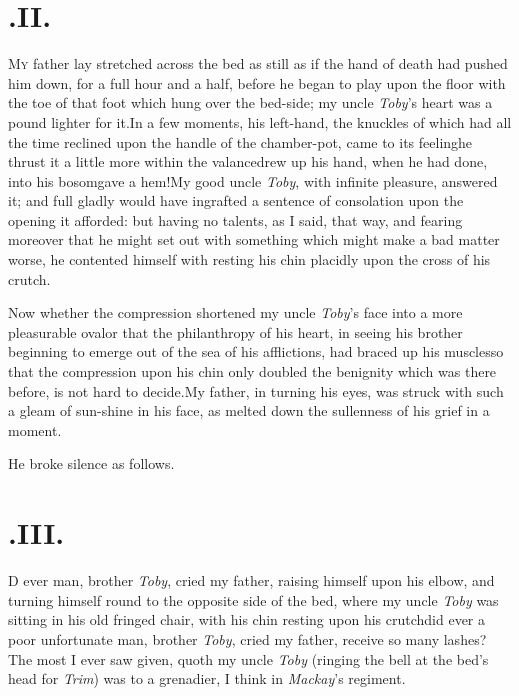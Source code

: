 \documentclass{article}
\begin{document}
\section{.\enspace II.}

\lettrine{M}{y} father lay stretched across the
bed as still as if the hand of death had pushed him down, for a
full hour and a half, before he began to play upon the floor
with the toe of that foot which hung over the bed-side; my uncle
\textit{Toby}’s heart was a pound lighter for
it.\tsh In a few moments, his left-hand, the knuckles of
which had all the time reclined upon the handle of the chamber-pot,
came to its feeling\tsk he thrust it a little more within the
valance\tsk drew up his hand, when he had done, into his
bosom\tsk gave a hem!\tsk My good uncle \textit{Toby}, with infinite
pleasure, answered it; and full gladly would have ingrafted a
sentence of consolation upon the opening it afforded: but having no
talents, as I said, that way, and fearing moreover that he might
set out with something which might make a bad matter worse, he
contented himself with resting his chin placidly upon the cross of
his crutch.

Now whether the compression shortened my uncle
\textit{Toby}’s face into a more pleasurable oval\tsk or that
the philanthropy of his heart, in seeing his brother beginning to
emerge out of the sea of his afflictions, had braced up his
muscles\tsh so that the compression upon his chin only
doubled the benignity which was there before, is not hard to
decide.\tsk My father, in turning his eyes, was struck
with such a gleam of sun-shine in his face, as melted down the
sullenness of his grief in a moment.

He broke silence as follows.

\section{.\enspace III.}

\lettrine{D}{} ever man, brother \textit{Toby}, cried\break
my father, raising himself upon\break
his elbow, and turning himself round to the opposite side of
the bed, where my uncle \textit{Toby} was sitting in his old
fringed chair, with his chin resting upon his\break
crutch\tsk did ever a poor unfortunate man, brother
\textit{Toby}, cried my father, receive so many lashes?\tsh
The most I ever saw given, quoth my uncle \textit{Toby}
(ringing the bell at the bed’s head for \textit{Trim})
was to a grenadier, I think in \textit{Mackay}’s regiment.
\end{document}
